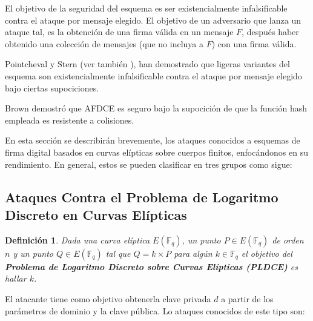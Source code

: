 \documentclass[11pt]{article}
\newcommand{\Fq}{\mathbb{F}_q}
\numberwithin{equation}{section} %
\numberwithin{figure}{section} %
\numberwithin{table}{section} %
\newtheorem{defi}{{\bf Definición }}[subsection]
\begin{document}
	El objetivo de la seguridad del esquema es ser existencialmente infalsificable contra el ataque por mensaje elegido. El objetivo de un adversario que lanza un ataque tal, es la obtención de una firma válida en un mensaje $F$, después haber obtenido una colección de mensajes (que no incluya a $F$) con una firma válida.

	Pointcheval y Stern \cite{PS} (ver también \cite{BPVY}), han demostrado que ligeras variantes del esquema son existencialmente infalsificable contra el ataque por mensaje elegido bajo ciertas supociciones.

	Brown \cite{Br} demostró que AFDCE es seguro bajo la supocición de que la función hash empleada es resistente a colisiones.

	En esta sección se describirán brevemente, los ataques conocidos a esquemas de firma digital basados en curvas elípticas sobre cuerpos finitos, enfocándonos en su rendimiento. En general, estos se pueden clasificar en tres grupos como sigue:

	\subsection{Ataques Contra el Problema de Logaritmo Discreto en Curvas Elípticas}

		\begin{defi}
			Dada una curva elíptica $E(\Fq)$, un punto $P\in E(\Fq)$ de orden $n$ y un punto $Q\in E(\Fq)$ tal que $Q=k\times P$ para algún $k\in\Fq$ el objetivo del \textbf{Problema de Logaritmo Discreto sobre Curvas Elípticas (PLDCE)} es hallar $k$.
		\end{defi}

		El atacante tiene como objetivo obtenerla clave privada $d$ a partir de los parámetros de dominio y la clave pública. Lo ataques conocidos de este tipo son:
\end{document}
